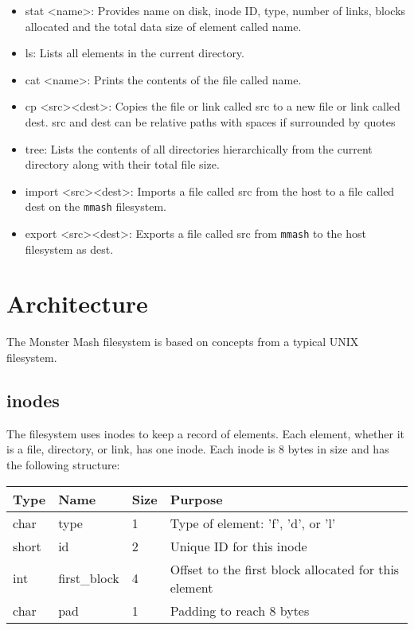 \documentclass[]{article}
\begin{document}
\begin{itemize}
	\item stat \textless name\textgreater: Provides name on disk, inode ID, type, number of links, blocks allocated and the total data size of element called name. 
	
	\item ls: Lists all elements in the current directory. 
	
	\item cat \textless name\textgreater: Prints the contents of the file called name. 
	
	\item cp \textless src\textgreater \space \textless dest\textgreater: Copies the file or link called src to a new file or link called dest. src and dest can be relative paths with spaces if surrounded by quotes
	
	\item tree: Lists the contents of all directories hierarchically from the current directory along with their total file size.
	
	\item import \textless src\textgreater \space \textless dest\textgreater: Imports a file called src from the host to a file called dest on the \texttt{mmash} filesystem. 
	
	\item export \textless src\textgreater \space \textless dest\textgreater: Exports a file called src from \texttt{mmash} to the host filesystem as dest. 
\end{itemize}

\section{Architecture}
The Monster Mash filesystem is based on concepts from a typical UNIX filesystem.

\subsection{inodes}
The filesystem uses inodes to keep a record of elements. Each element, whether it is a file, directory, or link, has one inode. Each inode is 8 bytes in size and has the following structure:

\begin{table}[h]
	\begin{tabular}{llll}
		Type  & Name         & Size & Purpose                                              \\ \hline
		char  & type         & 1    & Type of element: 'f', 'd', or 'l'                    \\
		short & id           & 2    & Unique ID for this inode                             \\
		int   & first\_block & 4    & Offset to the first block allocated for this element \\
		char  & pad          & 1    & Padding to reach 8 bytes                            
	\end{tabular}
\end{table}
\end{document}
